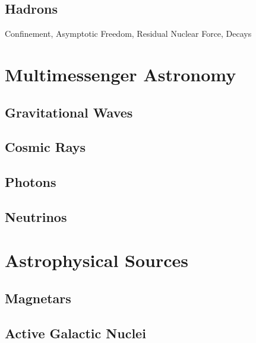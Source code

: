 \subsection*{Hadrons}
\label{sub:hadrons}

Confinement, Asymptotic Freedom, Residual Nuclear Force, Decays



\section{Multimessenger Astronomy}
\label{sec:multimessenger}



\subsection*{Gravitational Waves}
\label{sub:gravitational}



\subsection*{Cosmic Rays}
\label{sub:rays}



\subsection*{Photons}
\label{sub:photons}



\subsection*{Neutrinos}
\label{sub:neutrinos}



\section{Astrophysical Sources}
\label{sec:sources}



\subsection*{Magnetars}
\label{sub:magnetars}



\subsection*{Active Galactic Nuclei}
\label{sub:nuclei}
